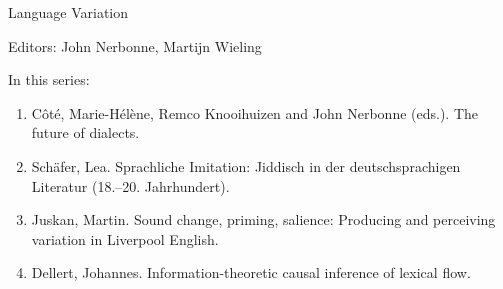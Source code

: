 {\large Language Variation}

\bigskip

Editors: John Nerbonne, Martijn Wieling

\bigskip

In this series:

\begin{enumerate}
\item Côté, Marie-Hélène, Remco Knooihuizen and John Nerbonne (eds.).  The future of dialects.
\item Schäfer, Lea. Sprachliche Imitation: Jiddisch in der deutschsprachigen Literatur (18.–20. Jahrhundert).
\item Juskan, Martin. Sound change, priming, salience: Producing and perceiving variation in Liverpool English.
\item Dellert, Johannes. Information-theoretic causal inference of lexical flow.
\end{enumerate}
 
